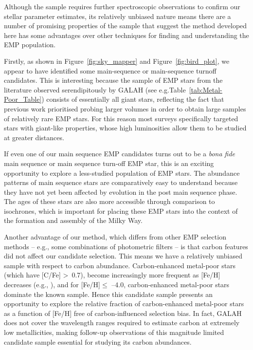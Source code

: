 \documentclass[]{aastex631}
\newcommand{\emps}{EMP stars\xspace}
\begin{document}
Although the sample requires further spectroscopic observations to confirm our stellar parameter estimates, its relatively unbiased nature means there are a number of promising properties of the sample that suggest the method developed here has some advantages over other techniques for finding and understanding the EMP population.

Firstly, as shown in Figure~\ref{fig:sky_mapper} and Figure~\ref{fig:bird_plot}, we appear to have identified some main-sequence or main-sequence turnoff candidates. This is interesting because the sample of EMP stars from the literature observed serendipitously by GALAH (see e.g.Table~\ref{tab:Metal-Poor_Table}) consists of essentially all giant stars, reflecting the fact that previous work \citep[e.g.,][]{Starkenburg2017} prioritised probing larger volumes in order to obtain large samples of relatively rare EMP stars. For this reason most surveys specifically targeted stars with giant-like properties, whose high luminosities allow them to be studied at greater distances.

If even one of our main sequence EMP candidates turns out to be a {\em bona fide} main sequence or main sequence turn-off EMP star, this is an exciting opportunity to explore a less-studied population of \emps. The abundance patterns of main sequence stars are comparatively easy to understand because they have not yet been affected by evolution in the post main sequence phase. The ages of these stars are also more accessible through comparison to isochrones, which is important for placing these \emps into the context of the formation and assembly of the Milky Way.

Another advantage of our method, which differs from other EMP selection methods -- e.g., some combinations of photometric filters \citep{Da_Costa_2019} -- is that carbon features did not affect our candidate selection. This means we have a relatively unbiased sample with respect to carbon abundance. Carbon-enhanced metal-poor stars (which have [C/Fe] \textgreater~0.7), become increasingly more frequent as [Fe/H] decreases (e.g., \citealt{2014ApJ...797...21P}), and for [Fe/H]$\leq$ –4.0, carbon-enhanced metal-poor stars dominate the known sample. Hence this candidate sample presents an opportunity to explore the relative fraction of carbon-enhanced metal-poor stars as a function of [Fe/H] free of carbon-influenced selection bias. In fact, GALAH does not cover the wavelength ranges required to estimate carbon at extremely low metallicities, making follow-up observations of this magnitude limited candidate sample essential for studying its carbon abundances.
\end{document}
